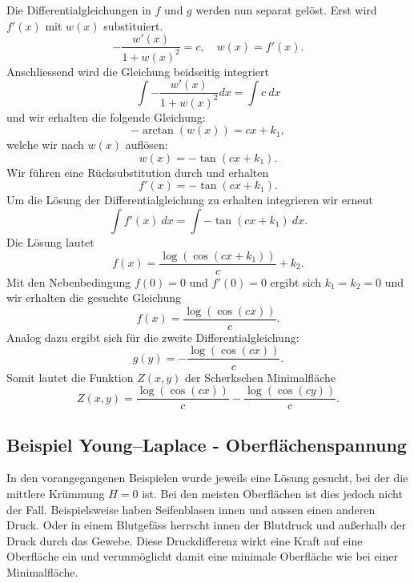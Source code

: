 \begin{refsection}
Die Differentialgleichungen in $f$ und $g$ werden nun separat gelöst. Erst wird $f'(x)$ mit $w(x)$ substituiert. 
\begin{equation}\label{ScherkDGL1}
-\dfrac{w'(x)}{1+w(x)^2}= c  , \quad w(x)=f'(x).
\end{equation}
Anschliessend wird die Gleichung  beidseitig integriert
\begin{equation}
\int -\dfrac{w'(x)}{1+w(x)^2} dx = \int c \ dx
\end{equation}
und wir erhalten die folgende Gleichung:
\begin{equation}
-\arctan(w(x)) = cx+k_1,
\end{equation}
welche wir nach $w(x)$ auflösen:
\begin{equation}
w(x) = -\tan(cx+k_1).
\end{equation}
Wir führen eine Rücksubstitution durch und erhalten
\begin{equation}\label{SchreckDGL2}
f'(x) = -\tan(cx+k_1).
\end{equation}
Um die Lösung der Differentialgleichung zu erhalten integrieren wir erneut
\begin{equation}
\int f'(x)\ dx = \int -\tan(cx+k_1)\ dx.
\end{equation}
 Die Lösung lautet
\begin{equation}
f(x) = \dfrac{\log(\cos(cx+k_1))}{c}+k_2.
\end{equation}
Mit den Nebenbedingung $f(0)=0$ und $f'(0)=0$ ergibt sich $k_1=k_2=0$ und wir erhalten die gesuchte Gleichung 
\begin{equation}
f(x) = \dfrac{\log(\cos(cx))}{c}.
\end{equation}
Analog dazu ergibt sich für die zweite Differentialgleichung:
\begin{equation}
g(y) = - \dfrac{\log(\cos(cx))}{c}.
\end{equation}
Somit lautet die Funktion $Z(x,y)$ der Scherkschen Minimalfläche
\begin{equation}
Z(x,y)=\dfrac{\log(\cos(cx))}{c}-\dfrac{\log(\cos(cy))}{c}.
\end{equation}

\subsection{Beispiel Young–Laplace - Oberflächenspannung}
\label{Young-Laplace}

\label{YL-Beschreibung}
In den vorangegangenen Beispielen wurde jeweils eine Lösung gesucht, bei der die mittlere Krümmung $H=0$ ist. Bei den meisten Oberflächen ist dies jedoch nicht der Fall. Beispielsweise haben Seifenblasen innen und aussen einen anderen Druck. Oder in einem Blutgefäss herrscht innen der Blutdruck und außerhalb der Druck durch das Gewebe. Diese Druckdifferenz wirkt eine Kraft auf eine Oberfläche ein und verunmöglicht damit eine minimale Oberfläche wie bei einer Minimalfläche.


\end{refsection}
